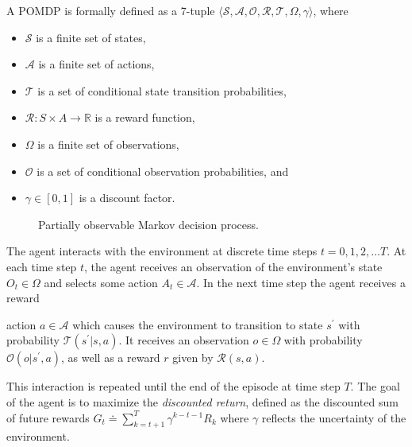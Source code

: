 A POMDP is formally defined as a 7-tuple \(\langle \mathcal{S}, \mathcal{A}, \mathcal{O}, \mathcal{R}, \mathcal{T}, \Omega, \gamma \rangle\), where

\begin{itemize}
    \item \(\mathcal{S}\) is a finite set of states,
    \item \(\mathcal{A}\) is a finite set of actions,
    \item \(\mathcal{T}\) is a set of conditional state transition probabilities,
    \item \(\mathcal{R} : S \times A \rightarrow \mathbb{R}\) is a reward function,
    \item \(\Omega\) is a finite set of observations,
    \item \(\mathcal{O}\) is a set of conditional observation probabilities, and
    \item \(\gamma \in [0, 1]\) is a discount factor.
\end{itemize}

\begin{figure}
    \centering
    
    \label{fig:pomdp}
    \caption{Partially observable Markov decision process.}
\end{figure}

The agent interacts with the environment at discrete time steps \(t = 0, 1, 2, \dots T\). At each time step \(t\), the agent receives an observation of the environment's state \(O_t \in \Omega\) and selects some action \(A_t \in \mathcal{A}\). In the next time step the agent receives a reward

action \(a \in \mathcal{A}\) which causes the environment to transition to state \(s^\prime\) with probability \(\mathcal{T}(s^\prime | s, a)\).
It receives an observation \(o \in \Omega\) with probability \(\mathcal{O}(o | s^\prime, a)\), as well as a reward \(r\) given by \(\mathcal{R}(s, a)\).

This interaction is repeated until the end of the episode at time step \(T\). The goal of the agent is to maximize the \textit{discounted return}, defined as the discounted sum of future rewards \(G_t \doteq \sum_{k=t+1}^T \gamma^{k-t-1} R_{k}\) where \(\gamma\) reflects the uncertainty of the environment.


